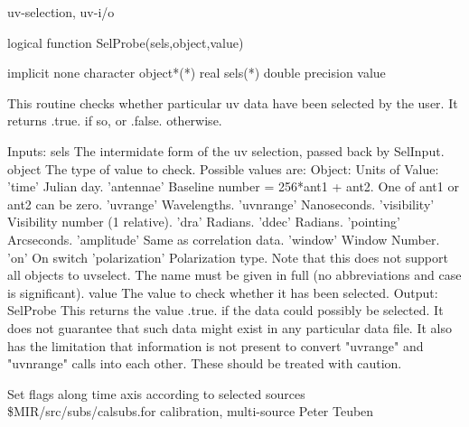\newline {} uv-selection, uv-i/o
\par{\tenpoint
{\eightpoint\begintt
        logical function SelProbe(sels,object,value)

        implicit none
        character object*(*)
        real sels(*)
        double precision value

  This routine checks whether particular uv data have been selected by
  the user. It returns .true. if so, or .false. otherwise.

  Inputs:
    sels       The intermidate form of the uv selection, passed back
               by SelInput.
    object     The type of value to check. Possible values are:
                 Object:               Units of Value:
                 'time'                Julian day.
                 'antennae'            Baseline number = 256*ant1 + ant2.
                                       One of ant1 or ant2 can be zero.
                 'uvrange'             Wavelengths.
                 'uvnrange'            Nanoseconds.
                 'visibility'          Visibility number (1 relative).
                 'dra'                 Radians.
                 'ddec'                Radians.
                 'pointing'            Arcseconds.
                 'amplitude'           Same as correlation data.
                 'window'              Window Number.
                 'on'                  On switch
                 'polarization'        Polarization type.
               Note that this does not support all objects to uvselect.
               The name must be given in full (no abbreviations and case
               is significant).
    value      The value to check whether it has been selected.
  Output:
    SelProbe   This returns the value .true. if the data could possibly be
               selected. It does not guarantee that such data might exist
               in any particular data file. It also has the limitation that
               information is not present to convert "uvrange" and "uvnrange"
               calls into each other. These should be treated with caution.
\endtt}
\par}
%
\noindent Set flags along time axis according to selected sources
\newline \ 
\newline {} \$MIR/src/subs/calsubs.for
\newline {} calibration, multi-source
\newline {} Peter Teuben
